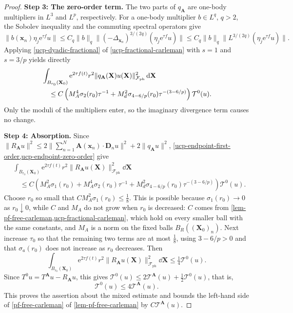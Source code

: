 \documentclass[final,reqno]{amsart}
\theoremstyle{remark}
\newcommand{\e}{\mathrm{e}}
\newcommand{\ph}{\mathrm{ph}}
\newcommand{\Fock}{\mathcal{F}}
\newcommand{\vx}{\mathbf{x}}
\newcommand{\vA}{{\mathbf{A}}}
\newcommand{\vX}{{\mathbf{X}}}
\newcommand{\vD}{{\mathbf{D}}}
\begin{document}
\begin{proof}
\noindent\textbf{Step 3: The zero-order term.}
The two parts of $q_\vA$ are one-body multipliers in $L^3$ and
$L^p$, respectively.  For a one-body multiplier $b\in L^q$,
$q>2$, the Sobolev inequality and the commuting spectral
operators give
\[
 \|b(\vx_n)\eta_j\e^{\tau f}u\|
 \leq C_q\|b\|_q\|(-\Delta_{\vx_n})^{3/(2q)}(\eta_j\e^{\tau f}u)\|
 \leq C_q\|b\|_q\|L^{3/(2q)}(\eta_j\e^{\tau f}u)\|.
\]
Applying \cref{ucp-dyadic-fractional} of \cref{ucp-fractional-carleman} with $s=1$ and $s=3/p$
yields directly
\begin{align}
 &\int_{B_{r_0}(\vX_0)}\e^{2\tau f(t)}r^2\|q_\vA(\vX)u(\vX)\|_{\Fock_\ph}^2\dd\vX\notag\\
 &\quad\leq C\left(
   M_A^4\sigma_2(r_0)\tau^{-1}
   +M_d^2\sigma_{4-6/p}(r_0)\tau^{-(3-6/p)}
         \right)\mathcal T^0(u).
 \label{ucp-endpoint-zero-order}
\end{align}
Only the moduli of the multipliers enter, so the imaginary divergence
term causes no change.

\noindent\textbf{Step 4: Absorption.}
Since
$\|R_\vA u\|^2\leq2\big\|\sum_{n=1}^N\vA(\vx_n)\cdot\vD_nu\big\|^2
 +2\|q_\vA u\|^2$,
\cref{ucp-endpoint-first-order,ucp-endpoint-zero-order} give
\begin{align*}
 &\int_{B_{r_0}(\vX_0)}\e^{2\tau f(t)}r^2\|R_\vA u(\vX)\|_{\Fock_\ph}^2\dd\vX\\
 &\quad\leq C\left(M_A^2\sigma_1(r_0)+M_A^4\sigma_2(r_0)\tau^{-1}
   +M_d^2\sigma_{4-6/p}(r_0)\tau^{-(3-6/p)}\right)\mathcal T^0(u).
\end{align*}
Choose $r_0$ so small that $CM_A^2\sigma_1(r_0)\leq\frac18$.  This is
possible because $\sigma_1(r_0)\to0$ as $r_0\downarrow0$, while $C$
and $M_A$ do not grow when $r_0$ is decreased: $C$ comes from
\cref{lem-pf-free-carleman,ucp-fractional-carleman}, which hold on
every smaller ball with the same constants, and $M_A$ is a norm on the
fixed balls $B_R((\vX_0)_n)$.  Next increase $\tau_0$ so that the
remaining two terms are at most $\frac18$, using $3-6/p>0$ and that
$\sigma_a(r_0)$ does not increase as $r_0$ decreases.  Then
\[
 \int_{B_{r_0}(\vX_0)}\e^{2\tau f(t)}r^2\|R_\vA u(\vX)\|_{\Fock_\ph}^2\dd\vX
 \leq\tfrac14\mathcal T^0(u).
\]
Since $T^0u=T^{\vA}u-R_\vA u$, this gives
$\mathcal T^0(u)\leq2\mathcal T^{\vA}(u)+\frac12\mathcal T^0(u)$, that is,
\begin{equation}\label{ucp-external-source-control}
 \mathcal T^0(u)\leq4\mathcal T^{\vA}(u).
\end{equation}
This proves the assertion about the mixed estimate and bounds the
left-hand side of \cref{pf-free-carleman} of \cref{lem-pf-free-carleman} by $C \mathcal T^{\vA}(u)$.


\end{proof}
\end{document}
